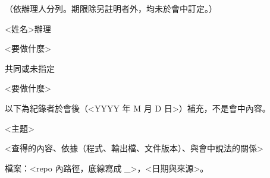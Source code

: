 \documentclass[12pt]{article}
\newcommand{\topic}[2][6]{\needspace{#1\baselineskip}\item #2\nopagebreak}
\newcommand{\mtgsection}[1]{%
  \needspace{4\baselineskip}%
  \vspace{0.9em}{\large #1}\par\nopagebreak\vspace{0.35em}\nopagebreak}
\begin{document}
\mtgsection{參、待辦事項}
（依辦理人分列。期限除另註明者外，均未於會中訂定。）
\begin{gitemize}
  \topic[4]{<姓名>辦理}
  \begin{gitemize}
    \item <要做什麼>
  \end{gitemize}
  \topic[4]{共同或未指定}
  \begin{gitemize}
    \item <要做什麼>
  \end{gitemize}
\end{gitemize}

\mtgsection{肆、補充說明}
以下為紀錄者於會後（<YYYY 年 M 月 D 日>）補充，不是會中內容。
\begin{gitemize}
  \topic[4]{<主題>}
  \begin{gitemize}
    \item <查得的內容、依據（程式、輸出檔、文件版本）、與會中說法的關係>
  \end{gitemize}
\end{gitemize}

\clearpage
\mtgsection{附件一　<檔案說明>}
{\small 檔案：<repo 內路徑，底線寫成 \_>，<日期與來源>。}
\end{document}
